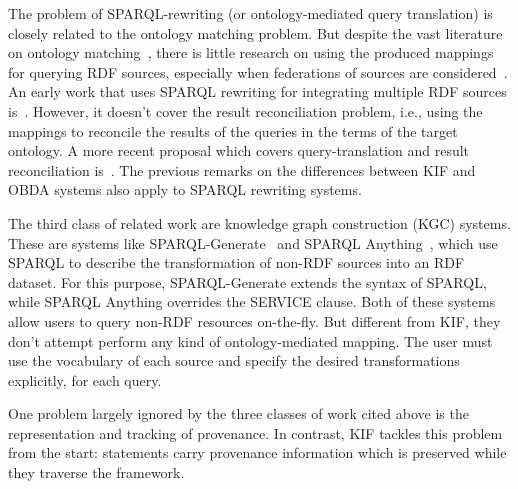 The problem of SPARQL-rewriting (or ontology-mediated query translation) is closely related to the ontology matching problem.
But despite the vast literature on ontology matching~\cite{Osman-I-2021}, there is little research on using the produced mappings for querying RDF sources, especially when federations of sources are considered~\cite{Cheng-S-2024}.
An early work that uses SPARQL rewriting for integrating multiple RDF sources is~\cite{Makris-K-2012}.
However, it doesn't cover the result reconciliation problem, i.e., using the mappings to reconcile the results of the queries in the terms of the target ontology.
A more recent proposal which covers query-translation and result reconciliation is~\cite{Cheng-S-2024}.
The previous remarks on the differences between KIF and OBDA systems also apply to SPARQL rewriting systems.




The third class of related work are knowledge graph construction (KGC) systems.
These are systems like SPARQL-Generate~\cite{Lefrancois-M-2017} and SPARQL Anything~\cite{Asprino-L-2023}, which use SPARQL to describe the transformation of non-RDF sources into an RDF dataset.
For this purpose, SPARQL-Generate extends the syntax of SPARQL, while SPARQL Anything overrides the SERVICE clause.
Both of these systems allow users to query non-RDF resources on-the-fly.
But different from KIF, they don't attempt perform any kind of ontology-mediated mapping.
The user must use the vocabulary of each source and specify the desired transformations explicitly, for each query.




One problem largely ignored by the three classes of work cited above is the representation and tracking of provenance.
In contrast, KIF tackles this problem from the start: statements carry provenance information which is preserved while they traverse the framework.





